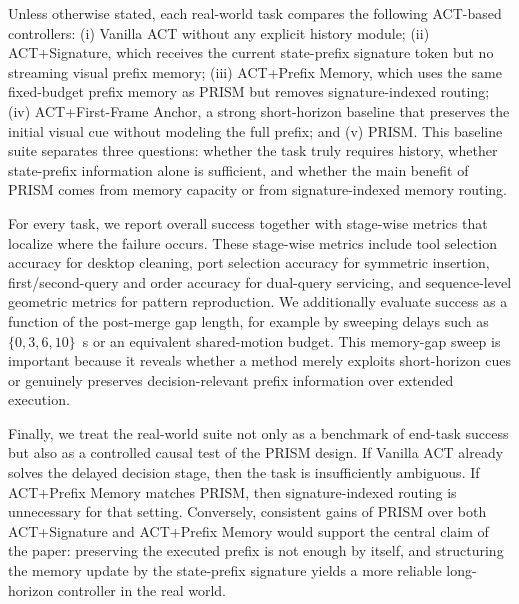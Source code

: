 Unless otherwise stated, each real-world task compares the following ACT-based controllers: (i) Vanilla ACT without any explicit history module; (ii) ACT+Signature, which receives the current state-prefix signature token but no streaming visual prefix memory; (iii) ACT+Prefix Memory, which uses the same fixed-budget prefix memory as PRISM but removes signature-indexed routing; (iv) ACT+First-Frame Anchor, a strong short-horizon baseline that preserves the initial visual cue without modeling the full prefix; and (v) PRISM. This baseline suite separates three questions: whether the task truly requires history, whether state-prefix information alone is sufficient, and whether the main benefit of PRISM comes from memory capacity or from signature-indexed memory routing.

For every task, we report overall success together with stage-wise metrics that localize where the failure occurs. These stage-wise metrics include tool selection accuracy for desktop cleaning, port selection accuracy for symmetric insertion, first/second-query and order accuracy for dual-query servicing, and sequence-level geometric metrics for pattern reproduction. We additionally evaluate success as a function of the post-merge gap length, for example by sweeping delays such as $\{0, 3, 6, 10\}$~s or an equivalent shared-motion budget. This memory-gap sweep is important because it reveals whether a method merely exploits short-horizon cues or genuinely preserves decision-relevant prefix information over extended execution.

Finally, we treat the real-world suite not only as a benchmark of end-task success but also as a controlled causal test of the PRISM design. If Vanilla ACT already solves the delayed decision stage, then the task is insufficiently ambiguous. If ACT+Prefix Memory matches PRISM, then signature-indexed routing is unnecessary for that setting. Conversely, consistent gains of PRISM over both ACT+Signature and ACT+Prefix Memory would support the central claim of the paper: preserving the executed prefix is not enough by itself, and structuring the memory update by the state-prefix signature yields a more reliable long-horizon controller in the real world.

